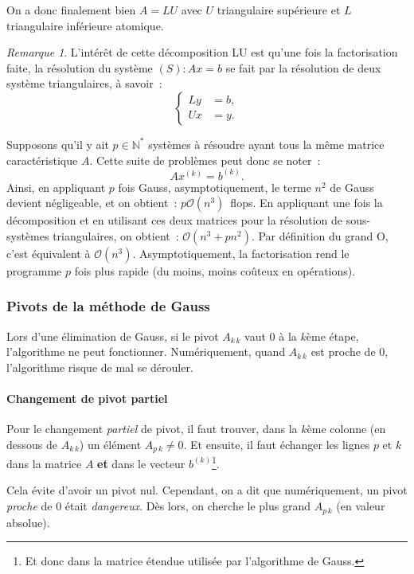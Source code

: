 \documentclass{article}
\theoremstyle{definition}
\theoremstyle{remark}
\newtheorem*{rmq}{Remarque}
\newcommand{\N}{\mathbb N}
\begin{document}
		On a donc finalement bien $A = LU$ avec $U$ triangulaire supérieure et $L$ triangulaire inférieure atomique.

		\begin{rmq} L'intérêt de cette décomposition LU est qu'une fois la factorisation faite, la résolution du système $(S) : Ax = b$ se fait par la résolution
		de deux système triangulaires, à savoir~:
		\[\begin{cases}Ly &= b, \\Ux &= y.\end{cases}\]

		Supposons qu'il y ait $p \in \N^*$ systèmes à résoudre ayant tous la même matrice caractéristique $A$. Cette suite de problèmes peut donc se noter~:
		\[Ax^{(k)} = b^{(k)}.\]
		Ainsi, en appliquant $p$ fois Gauss, asymptotiquement, le terme $n^2$ de Gauss devient négligeable, et on obtient~: $p\mathcal O(n^3)$~flops.
		En appliquant une fois la décomposition et en utilisant ces deux matrices pour la résolution de sous-systèmes triangulaires, on obtient~:
		$\mathcal O(n^3 + pn^2)$. Par définition du grand O, c'est équivalent à $\mathcal O(n^3)$. Asymptotiquement, la factorisation rend le programme $p$
		fois plus rapide (du moins, moins coûteux en opérations).
		\end{rmq}

		\subsubsection{Pivots de la méthode de Gauss}
		Lors d'une élimination de Gauss, si le pivot $A_{k\,k}$ vaut 0 à la $k$ème étape, l'algorithme ne peut fonctionner. Numériquement, quand $A_{k\,k}$ est
		proche de 0, l'algorithme risque de mal se dérouler.

		\paragraph{Changement de pivot partiel}
		Pour le changement \emph{partiel} de pivot, il faut trouver, dans la $k$ème colonne (en dessous de $A_{k\,k}$) un élément $A_{p\,k} \neq 0$. Et ensuite,
		il faut échanger les lignes $p$ et $k$ dans la matrice $A$ \textbf{et} dans le vecteur $b^{(k)}$\footnote{Et donc dans la matrice étendue utilisée par
		l'algorithme de Gauss.}.

		Cela évite d'avoir un pivot nul. Cependant, on a dit que numériquement, un pivot \emph{proche} de 0 était \emph{dangereux}. Dès lors, on cherche le plus
		grand $A_{p\,k}$ (en valeur absolue).
\end{document}
